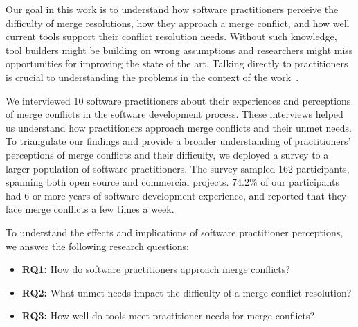 Our goal in this work is to understand how software practitioners perceive the difficulty of merge resolutions, how they approach a merge conflict, and how well current tools support their conflict resolution needs. Without such knowledge, tool builders might be building on wrong assumptions and researchers might miss opportunities for improving the state of the art.
Talking directly to practitioners is crucial to understanding the problems in the context of the work~\cite{fritz2010using, sillito2006questions, de2008answering, ko2007information}.

We interviewed 10 software practitioners about their experiences and perceptions of merge conflicts in the software development process. These interviews helped us understand how practitioners approach merge conflicts and their unmet needs.
To triangulate our findings and provide a broader understanding of practitioners' perceptions of merge conflicts and their difficulty, we deployed a survey to a larger population of software practitioners.
The survey sampled 162 participants, spanning both open source and commercial projects. 74.2\% of our participants had 6 or more years of software development experience, and reported that they face merge conflicts a few times a week.

To understand the effects and implications of software practitioner perceptions, we answer the following research questions:

\begin{itemize}
\item \textbf{RQ1:} How do software practitioners approach merge conflicts?
\item \textbf{RQ2:} What unmet needs impact the difficulty of a merge conflict resolution?
\item \textbf{RQ3:} How well do tools meet practitioner needs for merge conflicts?
\end{itemize}

